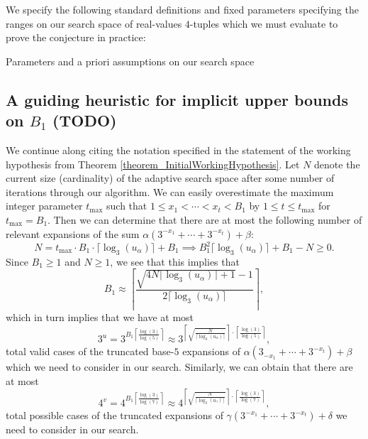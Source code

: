 \documentclass[12pt]{article}
\begin{document}
We specify the following standard definitions and fixed parameters specifying the ranges on our 
search space of real-values $4$-tuples which we must evaluate to prove the conjecture in 
practice: 
\begin{algorithm}[H] 
     \SetAlgoLined
     \BlankLine
     \caption{Parameters and a priori assumptions on our search space} 
\end{algorithm} 

\subsection{A guiding heuristic for implicit upper bounds on $B_1$ (TODO)} 

We continue along citing the notation specified in the statement of the working hypothesis from 
Theorem \ref{theorem_InitialWorkingHypothesis}. 
Let $N$ denote the current size (cardinality) of the adaptive search space after some number of 
iterations through our algorithm. We can easily overestimate the maximum integer parameter 
$t_{\max}$ such that $1 \leq x_1 < \cdots < x_t < B_1$ by $1 \leq t \leq t_{\max}$ for $t_{\max} = B_1$. 
Then we can determine that there are at most the following number of relevant expansions of the sum 
$\alpha(3^{-x_1}+\cdots+3^{-x_t}) + \beta$: 
\[
N = t_{\max} \cdot B_1 \cdot \lceil \log_3(u_{\alpha}) \rceil + B_1 \implies 
     B_1^2 \lceil \log_3(u_{\alpha}) \rceil + B_1 - N \geq 0. 
\]
Since $B_1 \geq 1$ and $N \geq 1$, we see that this implies that 
\[
B_1 \approx \left\lceil \frac{\sqrt{4N \lceil \log_3(u_{\alpha}) \rceil+1}-1}{ 
     2 \lceil \log_3(u_{\alpha}) \rceil}\right\rceil, 
\]
which in turn implies that we have at most 
\[
3^u = 3^{B_1 \left\lceil \frac{\log(3)}{\log(5)} \right\rceil} \approx 
     3^{\left\lceil \sqrt{\frac{N}{\lceil \log_3(u_{\alpha}) \rceil}} \right\rceil 
     \cdot \left\lceil \frac{\log(3)}{\log(5)} \right\rceil}, 
\]
total valid cases of the truncated base-$5$ expansions of $\alpha(3_{-x_1}+\cdots+3^{-x_t}) + \beta$ 
which we need to consider in our search. 
Similarly, we can obtain that there are at most 
\[
4^v = 4^{B_1 \left\lceil \frac{\log(3)}{\log(7)} \right\rceil} \approx 
     4^{\left\lceil \sqrt{\frac{N}{\lceil \log_3(u_{\gamma}) \rceil}} \right\rceil 
     \cdot \left\lceil \frac{\log(3)}{\log(7)} \right\rceil}, 
\] 
total possible cases of the truncated expansions of 
$\gamma(3^{-x_1}+\cdots+3^{-x_t}) + \delta$ we need to consider in our search. 
\end{document}
